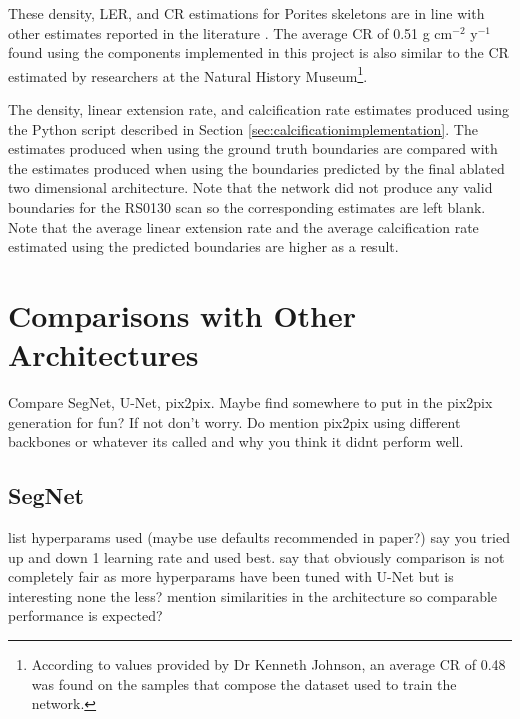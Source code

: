 These density, LER, and CR estimations for Porites skeletons are in line with other estimates reported in the literature \cite{calcification1, calcification2}. The average CR of 0.51 g cm$^{-2}$ y$^{-1}$ found using the components implemented in this project is also similar to the CR estimated by researchers at the Natural History Museum\footnote{According to values provided by Dr Kenneth Johnson, an average CR of 0.48 was found on the samples that compose the dataset used to train the network.}.



\begin{table}[!t]
    \centering
    \caption{The density, linear extension rate, and calcification rate estimates produced using the Python script described in Section \ref{sec:calcificationimplementation}. The estimates produced when using the ground truth boundaries are compared with the estimates produced when using the boundaries predicted by the final ablated two dimensional architecture. Note that the network did not produce any valid boundaries for the RS0130 scan so the corresponding estimates are left blank. Note that the average linear extension rate and the average calcification rate estimated using the predicted boundaries are higher as a result.}
    \small
    
    \label{tab:calcification}
\end{table}

\section{Comparisons with Other Architectures}

Compare SegNet, U-Net, pix2pix. Maybe find somewhere to put in the pix2pix generation for fun? If not don't worry. Do mention pix2pix using different backbones or whatever its called and why you think it didnt perform well.

\subsection{SegNet}

list hyperparams used (maybe use defaults recommended in paper?) say you tried up and down 1 learning rate and used best. say that obviously comparison is not completely fair as more hyperparams have been tuned with U-Net but is interesting none the less? mention similarities in the architecture so comparable performance is expected?

